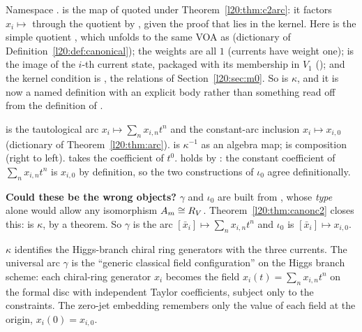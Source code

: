 \begin{dictionary}
Namespace .  is the map of
 quoted under Theorem~\ref{l20:thm:c2arc}: it factors
$x_i\mapsto$  through the quotient by , given the proof  that  lies in the kernel. Here
 is the simple quotient , which unfolds to the same VOA as 
(dictionary of Definition~\ref{l20:def:canonical}); the weights are all $1$ (currents have weight one);  is the
image of the $i$-th current state, packaged with its membership in $V_1$ (); and the kernel condition is
, the relations of Section~\ref{l20:sec:m0}. So  is $\kappa$, and it is now a
named definition with an explicit body rather than something read off from the definition of .

 is the tautological arc $x_i\mapsto\sum_nx_{i,n}t^n$ and  the
constant-arc inclusion $x_i\mapsto x_{i,0}$ (dictionary of Theorem~\ref{l20:thm:arc}). 
is $\kappa^{-1}$ as an algebra map;  is composition (right to left).  takes the
coefficient of $t^0$.  holds by : the constant coefficient of
$\sum_nx_{i,n}t^n$ is $x_{i,0}$ by definition, so the two constructions of $\iota_0$ agree definitionally.

\textbf{Could these be the wrong objects?} $\gamma$ and $\iota_0$ are built from , whose \emph{type}
alone would allow any isomorphism $A_m\cong R_V$. Theorem~\ref{l20:thm:canonc2} closes this: 
is $\kappa$, by a theorem. So $\gamma$ is the arc $[\bar x_i]\mapsto\sum_nx_{i,n}t^n$ and $\iota_0$ is $[\bar x_i]\mapsto x_{i,0}$.
\end{dictionary}

\begin{physics}
$\kappa$ identifies the Higgs-branch chiral ring generators with the three currents. The universal arc $\gamma$ is the
``generic classical field configuration'' on the Higgs branch scheme: each chiral-ring generator $x_i$ becomes the field
$x_i(t)=\sum_nx_{i,n}t^n$ on the formal disc with independent Taylor coefficients, subject only to the constraints. The
zero-jet embedding remembers only the value of each field at the origin, $x_i(0)=x_{i,0}$.
\end{physics}

